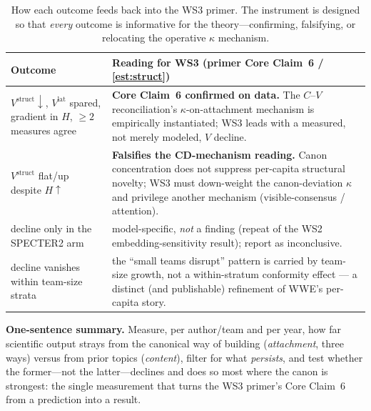 \documentclass[11pt,letterpaper]{article}
\theoremstyle{definition}
\theoremstyle{plain}
\newcommand{\Vstruct}{V^{\mathrm{struct}}}
\newcommand{\Vlat}{V^{\mathrm{lat}}}
\begin{document}
\begin{table}[h]
\centering
\small
\begin{tabularx}{\textwidth}{@{}lX@{}}
\toprule
Outcome & Reading for WS3 (primer Core Claim~6 / \cref{est:struct}) \\
\midrule
$\Vstruct\!\downarrow$, $\Vlat$ spared, gradient in $H$, $\ge 2$ measures agree &
\textbf{Core Claim~6 confirmed on data.} The $C$--$V$ reconciliation's
$\kappa$-on-attachment mechanism is empirically instantiated; WS3 leads with a
measured, not merely modeled, $V$ decline. \\
$\Vstruct$ flat/up despite $H\!\uparrow$ &
\textbf{Falsifies the CD-mechanism reading.} Canon concentration does not suppress
per-capita structural novelty; WS3 must down-weight the canon-deviation $\kappa$
and privilege another mechanism (visible-consensus / attention). \\
decline only in the SPECTER2 arm & model-specific, \emph{not} a finding (repeat of
the WS2 embedding-sensitivity result); report as inconclusive. \\
decline vanishes within team-size strata & the ``small teams disrupt'' pattern is
carried by team-size growth, not a within-stratum conformity effect --- a distinct
(and publishable) refinement of WWE's per-capita story. \\
\bottomrule
\end{tabularx}
\caption{How each outcome feeds back into the WS3 primer. The instrument is
designed so that \emph{every} outcome is informative for the theory---confirming,
falsifying, or relocating the operative $\kappa$ mechanism.}
\label{tab:interp}
\end{table}

\noindent\textbf{One-sentence summary.} Measure, per author/team and per year,
how far scientific output strays from the canonical way of building
(\emph{attachment}, three ways) versus from prior topics (\emph{content}), filter
for what \emph{persists}, and test whether the former---not the latter---declines
and does so most where the canon is strongest: the single measurement that turns
the WS3 primer's Core Claim~6 from a prediction into a result.
\end{document}
